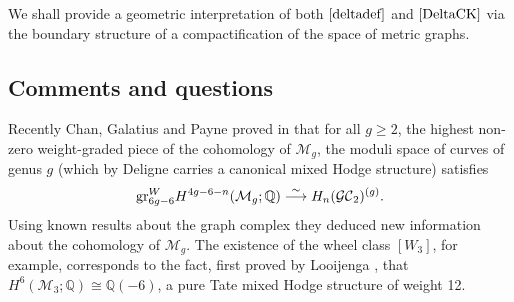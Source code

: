 \documentclass[pdftex]{sigma}%
\numberwithin{equation}{section}
\newcommand{\Q}{\mathbb Q}
\newcommand{\GC}{\mathcal{GC}}
\newcommand{\0}{\color{blue}{\mathsf{0}}}
\begin{document}
We shall provide a geometric interpretation of both $\eqref{deltadef}$ and $\eqref{DeltaCK}$ via the boundary structure of a compactification of the space of metric graphs.
\subsection{Comments and questions}
Recently Chan, Galatius and Payne proved in \cite[Theorems 1 and 2]{CGP} that for all $g\geq 2$, the highest non-zero weight-graded piece of the cohomology of $\mathcal{M}_g$, the moduli space of curves of genus $g$ (which by Deligne \cite{delignehodge2} carries a canonical mixed Hodge structure) satisfies
\begin{gather} \label{CGP}
{\rm g r}^W_{6g-6} H^{4g-6-n} (\mathcal{M}_g;\Q) \overset{\sim}{\longrightarrow} H_{n}( \GC_2)^{(g)}.
\end{gather}
Using known results about the graph complex they deduced new information about the cohomology of $\mathcal{M}_g$. The existence of the
wheel class $[W_3]$, for example,
 corresponds to the fact, first proved by Looijenga \cite{Looijenga}, that
$H^6(\mathcal{M}_3;\Q)\cong \Q(-6)$, a pure Tate mixed Hodge structure of weight 12.
\end{document}
